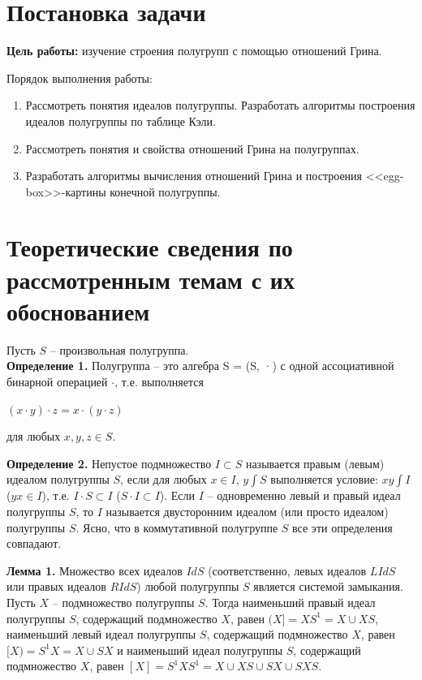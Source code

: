 \documentclass[bachelor, och, labwork]{shiza}
\begin{document}

\section{Постановка задачи}

  \textbf{Цель работы:} изучение строения полугрупп с помощью отношений Грина.
  
  Порядок выполнения работы:
    \begin{enumerate}
        \item Рассмотреть понятия идеалов полугруппы. Разработать алгоритмы построения идеалов полугруппы по таблице Кэли.
        \item Рассмотреть понятия и свойства отношений Грина на полугруппах.
        \item Разработать алгоритмы вычисления отношений Грина и построения <<egg-box>>-картины конечной полугруппы.
    \end{enumerate}

\section{Теоретические сведения по рассмотренным темам с их обоснованием}

  Пусть $S$ -- произвольная полугруппа.\\
  \textbf{Определение 1.} Полугруппа – это алгебра S = (S, ·) с одной ассоциативной бинарной
    операцией $\cdot$, т.е. выполняется
      \begin{center}
        $(x \cdot y) \cdot z = x \cdot (y \cdot z)$
      \end{center}
    для любых $x,y,z \in S$.
    
    \textbf{Определение 2.} Непустое подмножество $I \subset S$ называется правым (левым) идеалом полугруппы $S$,
    если для любых $x \in I$, $y \int S$ выполняется условие: $xy \int I$ ($yx \in I$), т.е. $I \cdot S \subset I$ ($S \cdot I \subset I$).
    Если $I$ -- одновременно левый и правый идеал полугруппы $S$, то $I$ называется двусторонним идеалом (или просто идеалом) полугруппы
    $S$. Ясно, что в коммутативной полугруппе $S$ все эти определения совпадают.

    \textbf{Лемма 1.} Множество всех идеалов $Id S$  (соответственно, левых идеалов $LId S$  или правых идеалов $RId S$) любой
    полугруппы $S$ является системой замыкания. Пусть $X$ -- подмножество полугруппы $S$. Тогда наименьший правый идеал 
    полугруппы $S$, содержащий подмножество $X$, равен $(X] = XS^1 = X \cup XS$, наименьший левый идеал полугруппы $S$, содержащий
    подмножество $X$, равен $[X) = S^1X = X \cup SX$  и наименьший идеал полугруппы $S$, содержащий подмножество $X$, равен 
    $[X] = S^1XS^1 = X \cup XS \cup SX \cup SXS$.
    
\end{document}
